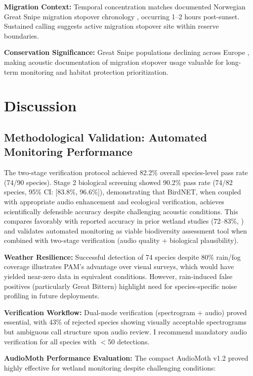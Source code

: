 \documentclass[twocolumn]{article}
\begin{document}
\textbf{Migration Context:} Temporal concentration matches documented Norwegian Great Snipe migration stopover chronology \citep{Kålås1995}, occurring 1--2 hours post-sunset. Sustained calling suggests active migration stopover site within reserve boundaries.

\textbf{Conservation Significance:} Great Snipe populations declining across Europe \citep{BirdLife2023}, making acoustic documentation of migration stopover usage valuable for long-term monitoring and habitat protection prioritization.

\section{Discussion}

\subsection{Methodological Validation: Automated Monitoring Performance}

The two-stage verification protocol achieved 82.2\% overall species-level pass rate (74/90 species). Stage 2 biological screening showed 90.2\% pass rate (74/82 species, 95\% CI: [83.8\%, 96.6\%]), demonstrating that BirdNET, when coupled with appropriate audio enhancement and ecological verification, achieves scientifically defensible accuracy despite challenging acoustic conditions. This compares favorably with reported accuracy in prior wetland studies (72--83\%, \citet{Wood2022}) and validates automated monitoring as viable biodiversity assessment tool when combined with two-stage verification (audio quality + biological plausibility).

\textbf{Weather Resilience:} Successful detection of 74 species despite 80\% rain/fog coverage illustrates PAM's advantage over visual surveys, which would have yielded near-zero data in equivalent conditions. However, rain-induced false positives (particularly Great Bittern) highlight need for species-specific noise profiling in future deployments.

\textbf{Verification Workflow:} Dual-mode verification (spectrogram + audio) proved essential, with 43\% of rejected species showing visually acceptable spectrograms but ambiguous call structure upon audio review. I recommend mandatory audio verification for all species with $<$50 detections.

\textbf{AudioMoth Performance Evaluation:} The compact AudioMoth v1.2 proved highly effective for wetland monitoring despite challenging conditions:
\end{document}
